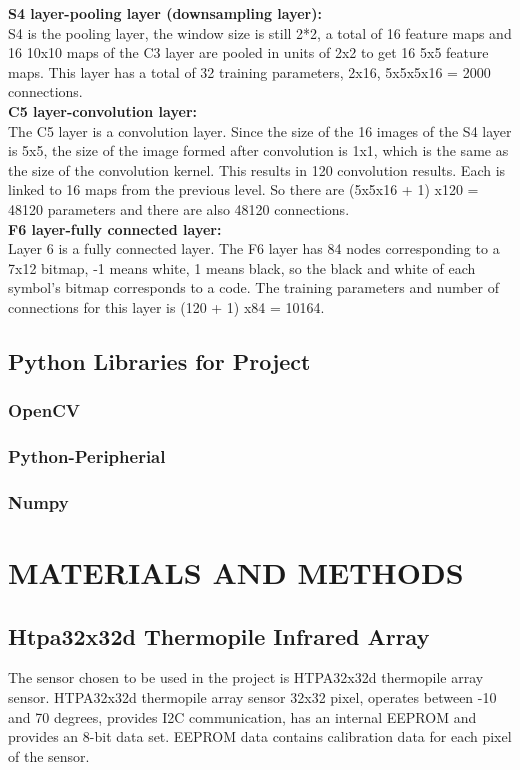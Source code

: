 \documentclass[thesis]{deutez}
\begin{document}
\textbf{S4 layer-pooling layer (downsampling layer):}\\
S4 is the pooling layer, the window size is still 2*2, a total of 16 feature maps and 16 10x10 maps of the C3 layer are pooled in units of 2x2 to get 16 5x5 feature maps. This layer has a total of 32 training parameters, 2x16, 5x5x5x16 = 2000 connections.\cite{lenet}\\
\textbf{C5 layer-convolution layer:}\\
The C5 layer is a convolution layer. Since the size of the 16 images of the S4 layer is 5x5, the size of the image formed after convolution is 1x1, which is the same as the size of the convolution kernel. This results in 120 convolution results. Each is linked to 16 maps from the previous level. So there are (5x5x16 + 1) x120 = 48120 parameters and there are also 48120 connections.\cite{lenet}\\
\textbf{F6 layer-fully connected layer:}\\
Layer 6 is a fully connected layer. The F6 layer has 84 nodes corresponding to a 7x12 bitmap, -1 means white, 1 means black, so the black and white of each symbol's bitmap corresponds to a code. The training parameters and number of connections for this layer is (120 + 1) x84 = 10164.\cite{lenet}\\
\section{Python Libraries for Project}

\subsection{OpenCV}

\subsection{Python-Peripherial}

\subsection{Numpy}

\chapter{MATERIALS AND METHODS}
\section{Htpa32x32d Thermopile Infrared Array}
The sensor chosen to be used in the project is HTPA32x32d thermopile array sensor.
HTPA32x32d thermopile array sensor 32x32 pixel, operates between -10 and 70 degrees,
provides I2C communication, has an internal EEPROM and provides an 8-bit data set.
EEPROM data contains calibration data for each pixel of the sensor.\\
\end{document}

